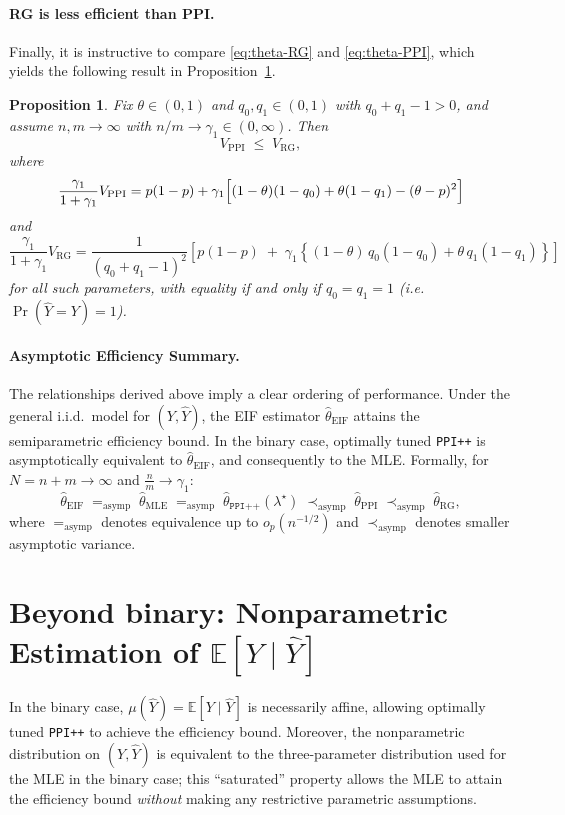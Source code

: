 \documentclass[11pt]{article}
\newcommand{\1}{\mathbf{1}}
\newtheorem{proposition}{Proposition}
\theoremstyle{remark}
\begin{document}
\paragraph{RG is less efficient than PPI.} Finally, it is instructive to compare \eqref{eq:theta-RG} and \eqref{eq:theta-PPI}, which yields the following result in Proposition~\ref{prop:PPI-dominates-RG}.

\begin{proposition}
\label{prop:PPI-dominates-RG}
Fix $\theta\in(0,1)$ and $q_0,q_1\in(0,1)$ with $q_0+q_1-1>0$, and assume $n,m\to\infty$ with $n/m\to\gamma_1\in(0,\infty)$. Then
\[
V_{\mathrm{PPI}} \;\le\; V_{\mathrm{RG}},
\]
where
\[
\frac{\gamma_1}{1+\gamma_1}V_{\mathrm{PPI}} = p(1-p)
+
\gamma_1\Bigl[(1-\theta)(1-q_0)+\theta(1-q_1)-(\theta-p)^2\Bigr]
\]
and 
\[
\frac{\gamma_1}{1+\gamma_1}V_{\mathrm{RG}} =\frac{1}{(q_0+q_1-1)^2}
\left[
p(1-p)
\;+\;
\gamma_1\left\{
(1-\theta)\,q_0(1-q_0)
+
\theta\,q_1(1-q_1)
\right\}
\right]
\]
for all such parameters, with equality if and only if $q_0=q_1=1$ (i.e. $\Pr(\hat{Y} = Y)=1$).
\end{proposition}


\paragraph{Asymptotic Efficiency Summary.}
The relationships derived above imply a clear ordering of performance. Under the general i.i.d.\ model for $(Y,\hat Y)$, the EIF estimator $\hat\theta_{\mathrm{EIF}}$ attains the semiparametric efficiency bound. In the binary case, optimally tuned \texttt{PPI++} is asymptotically equivalent to $\hat\theta_{\mathrm{EIF}}$, and consequently to the MLE. Formally, for $N=n+m \to \infty$ and $\frac{n}{m}\to\gamma_1$:
\[
\hat\theta_{\mathrm{EIF}} 
\;=_{\mathrm{asymp}}\; 
\hat\theta_{\mathrm{MLE}} 
\;=_{\mathrm{asymp}}\; 
\hat\theta_{\mathrm{\texttt{PPI++}}}(\lambda^\star) 
\;\prec_{\mathrm{asymp}}\; 
\hat\theta_{\mathrm{PPI}} 
\;\prec_{\mathrm{asymp}}\; 
\hat\theta_{\mathrm{RG}},
\]
where $=_{\mathrm{asymp}}$ denotes equivalence up to $o_p(n^{-1/2})$ and $\prec_{\mathrm{asymp}}$ denotes smaller asymptotic variance.

\section{Beyond binary: Nonparametric Estimation of $\mathbb{E}[Y\mid \hat Y]$}
\label{subsec:eif-beyond}

In the binary case, $\mu(\hat Y) = \mathbb{E}[Y\mid \hat Y]$ is necessarily affine, allowing optimally tuned \texttt{PPI++} to achieve the efficiency bound. Moreover, the nonparametric distribution on $(Y, \hat{Y})$ is equivalent to the three-parameter distribution used for the MLE in the binary case; this ``saturated'' property allows the MLE to attain the efficiency bound \emph{without} making any restrictive parametric assumptions.
\end{document}
